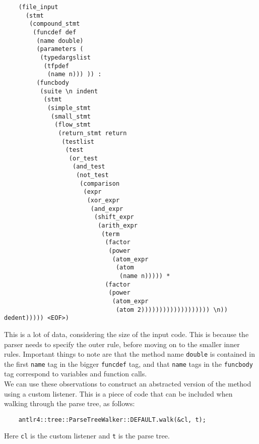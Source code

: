\documentclass[../Main.tex]{subfiles}
\begin{document}
\begin{lstlisting}
    (file_input
      (stmt
       (compound_stmt
        (funcdef def
         (name double)
         (parameters (
          (typedargslist
           (tfpdef
            (name n))) )) :
         (funcbody
          (suite \n indent
           (stmt
            (simple_stmt
             (small_stmt
              (flow_stmt
               (return_stmt return
                (testlist
                 (test
                  (or_test
                   (and_test
                    (not_test
                     (comparison
                      (expr
                       (xor_expr
                        (and_expr
                         (shift_expr
                          (arith_expr
                           (term
                            (factor
                             (power
                              (atom_expr
                               (atom
                                (name n))))) *
                            (factor
                             (power
                              (atom_expr
                               (atom 2))))))))))))))))))) \n)) dedent))))) <EOF>)
\end{lstlisting}
\vspace{15pt}
This is a lot of data, considering the size of the input code. This is because the parser needs to specify the outer rule, before moving on to the smaller inner rules. Important things to note are that the method name \texttt{double} is contained in the first \texttt{name} tag in the bigger \texttt{funcdef} tag, and that \texttt{name} tags in the \texttt{funcbody} tag correspond to variables and function calls.\\

We can use these observations to construct an abstracted version of the method using a custom listener. This is a piece of code that can be included when walking through the parse tree, as follows:\\

\begin{lstlisting}
    antlr4::tree::ParseTreeWalker::DEFAULT.walk(&cl, t);
\end{lstlisting}
\vspace{15pt}

Here \texttt{cl} is the custom listener and \texttt{t} is the parse tree.\\
\end{document}
